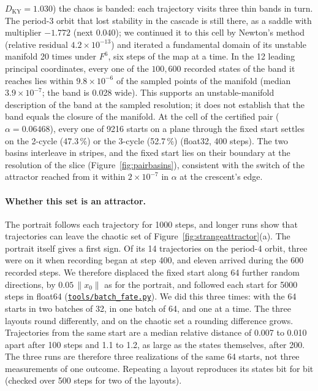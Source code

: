 \documentclass[11pt,letterpaper]{article}
\newcommand{\repourl}{https://github.com/tdj28/neural-shrimp}
\newcommand{\laterrepo}[1]{\href{\repourl/blob/0399fee2e9537a50993482aea8ec417e70286ac4/#1}{\nolinkurl{#1}}}
\begin{document}
$D_{\mathrm{KY}}=1.030$) the chaos is banded: each trajectory visits three thin bands in turn. The period-3 orbit that
lost stability in the cascade is still there, as a saddle with multiplier $-1.772$ (next $0.040$); we continued it to
this cell by Newton's method (relative residual $4.2\times10^{-13}$) and iterated a fundamental domain of its unstable
manifold 20 times under $F^6$, six steps of the map at a time. In the 12 leading principal coordinates, every one of the $100{,}600$ recorded
states of the band it reaches lies within $9.8\times10^{-6}$ of the sampled points of the manifold (median
$3.9\times10^{-7}$; the band is 0.028 wide). This supports an unstable-manifold description of the band at the sampled
resolution; it does not establish that the band equals the closure of the manifold. At the cell of the certified pair ($\alpha=0.06468$), every one of 9216 starts on a plane through the fixed
start settles on the 2-cycle (47.3\,\%) or the 3-cycle (52.7\,\%) (float32, 400 steps). The two basins interleave
in stripes, and the fixed start lies on their boundary at the resolution of the slice
(Figure~\ref{fig:pairbasins}), consistent with the switch of the attractor reached from it within
$2\times10^{-7}$ in $\alpha$ at the crescent's edge.

\paragraph{Whether this set is an attractor.} The portrait follows each trajectory for 1000 steps, and longer runs
show that trajectories can leave the chaotic set of Figure~\ref{fig:strangeattractor}(a). The portrait itself gives a
first sign. Of its 14 trajectories on the period-4 orbit, three were on it when recording began at step 400, and
eleven arrived during the 600 recorded steps. We therefore displaced the fixed start along 64 further random
directions, by $0.05\,\lVert x_0\rVert$ as for the portrait, and followed each start for 5000 steps in float64
(\laterrepo{tools/batch_fate.py}). We did this
three times: with the 64 starts in two batches of 32, in one batch of 64, and one at a time. The three layouts round
differently, and on the chaotic set a rounding difference grows. Trajectories from the same start are a median
relative distance of 0.007 to 0.010 apart after 100 steps and 1.1 to 1.2, as large as the states themselves, after
200. The three runs are therefore three realizations of the same 64 starts, not three measurements of one outcome.
Repeating a layout reproduces its states bit for bit (checked over 500 steps for two of the layouts).
\end{document}
